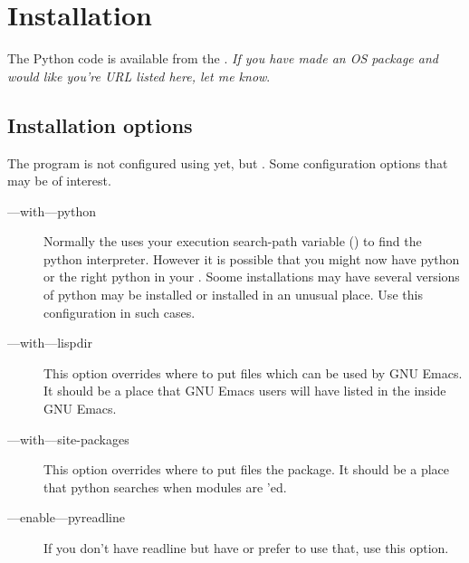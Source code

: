 \section{Installation}

The Python code is available from the .
{\em If you have made an OS package and would like you're URL listed
here, let me know}.

\subsection{Installation options}

The program is not configured using  yet, but
. Some configuration options that may be of interest.

\begin{description} 

\item[--{}--with--{}--python]

Normally the  uses your execution search-path variable
() to find the python interpreter. However it is possible
that you might now have python or the right python in your
.  Soome installations may have several versions of python
may be installed or installed in an unusual place. Use this
configuration in such cases.

\item[--{}--with--{}--lispdir]

This option overrides where to put files which can be used by GNU Emacs. It
should be a place that GNU Emacs users will have listed in the
 inside GNU Emacs.

\item[--{}--with--{}--site-packages]

This option overrides where to put files the  package.  It
should be a place that python searches when modules are
'ed.

\item[--{}--enable--{}--pyreadline]

If you don't have readline but have  or prefer to use
that, use this option.

\end{description}

